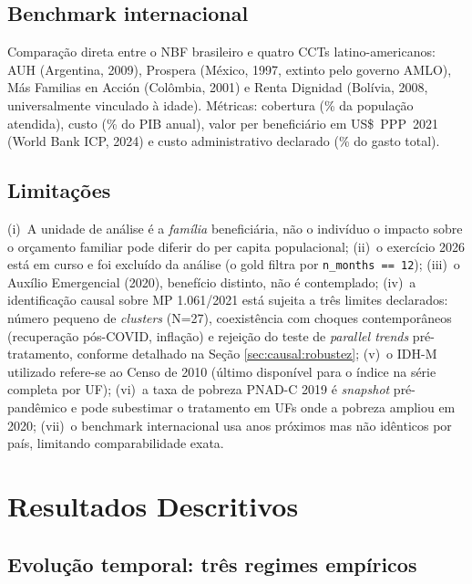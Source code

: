 \documentclass[12pt,a4paper,oneside]{article}
\begin{document}
\subsection{Benchmark internacional}

Comparação direta entre o NBF brasileiro e quatro CCTs
latino-americanos: AUH (Argentina, 2009\textendash), Prospera
(México, 1997, extinto pelo governo
AMLO), Más Familias en Acción (Colômbia, 2001\textendash) e
Renta Dignidad (Bolívia, 2008\textendash, universalmente vinculado
à idade). Métricas: cobertura (\% da população atendida), custo
(\% do PIB anual), valor per beneficiário em US\$~PPP~2021
(World Bank ICP, 2024) e custo administrativo declarado
(\% do gasto total).

\subsection{Limitações}

(i)~A unidade de análise é a \textit{família} beneficiária, não o
indivíduo \textemdash{} o impacto sobre o orçamento familiar pode
diferir do per capita populacional;
(ii)~o exercício 2026 está em curso e foi excluído da análise (o
gold filtra por \texttt{n\_months == 12});
(iii)~o Auxílio Emergencial (2020), benefício
distinto, não é contemplado;
(iv)~a identificação causal sobre MP 1.061/2021 está sujeita a
três limites declarados: número pequeno de \textit{clusters}
(N=27), coexistência com choques contemporâneos (recuperação
pós-COVID, inflação) e rejeição do teste de \textit{parallel trends}
pré-tratamento, conforme detalhado na Seção
\ref{sec:causal:robustez};
(v)~o IDH-M utilizado refere-se ao Censo de 2010 (último
disponível para o índice na série completa por UF);
(vi)~a taxa de pobreza PNAD-C 2019 é \textit{snapshot}
pré-pandêmico e pode subestimar o tratamento em UFs onde a
pobreza ampliou em 2020;
(vii)~o benchmark internacional usa anos próximos mas não
idênticos por país, limitando comparabilidade exata.

\section{Resultados Descritivos}\label{sec:resultados}

\subsection{Evolução temporal: três regimes empíricos}
\end{document}
